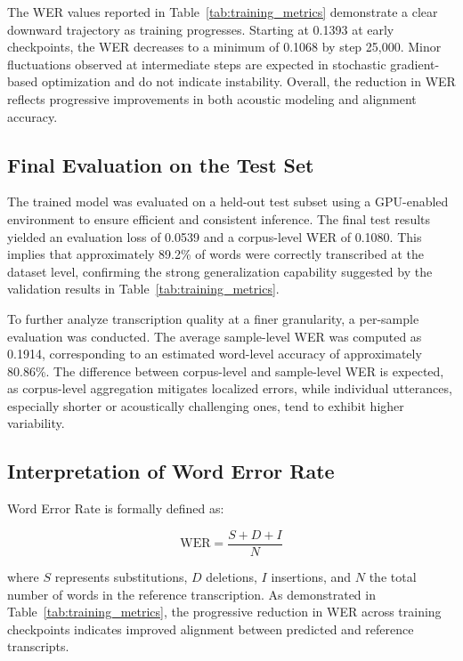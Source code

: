 The WER values reported in Table~\ref{tab:training_metrics} demonstrate a clear downward trajectory as training progresses. Starting at 0.1393 at early checkpoints, the WER decreases to a minimum of 0.1068 by step 25,000. Minor fluctuations observed at intermediate steps are expected in stochastic gradient-based optimization and do not indicate instability. Overall, the reduction in WER reflects progressive improvements in both acoustic modeling and alignment accuracy.

\subsection{Final Evaluation on the Test Set}

The trained model was evaluated on a held-out test subset using a GPU-enabled environment to ensure efficient and consistent inference. The final test results yielded an evaluation loss of 0.0539 and a corpus-level WER of 0.1080. This implies that approximately 89.2\% of words were correctly transcribed at the dataset level, confirming the strong generalization capability suggested by the validation results in Table~\ref{tab:training_metrics}.

To further analyze transcription quality at a finer granularity, a per-sample evaluation was conducted. The average sample-level WER was computed as 0.1914, corresponding to an estimated word-level accuracy of approximately 80.86\%. The difference between corpus-level and sample-level WER is expected, as corpus-level aggregation mitigates localized errors, while individual utterances, especially shorter or acoustically challenging ones, tend to exhibit higher variability.

\subsection{Interpretation of Word Error Rate}

Word Error Rate is formally defined as:

\begin{equation}
\text{WER} = \frac{S + D + I}{N}
\end{equation}

where $S$ represents substitutions, $D$ deletions, $I$ insertions, and $N$ the total number of words in the reference transcription. As demonstrated in Table~\ref{tab:training_metrics}, the progressive reduction in WER across training checkpoints indicates improved alignment between predicted and reference transcripts.

